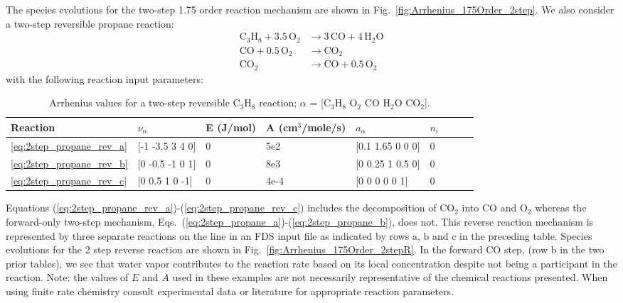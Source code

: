 \documentclass[11pt]{book}
\begin{document}
The species evolutions for the two-step 1.75 order reaction mechanism are shown in Fig.~\ref{fig:Arrhenius_175Order_2step}. We also consider a two-step reversible propane reaction:
\begin{subequations}
\begin{align}
\label{eq:2step_propane_rev_a}
\mathrm{C_3H_8+3.5 \, O_2} &\rightarrow \mathrm{3 \, CO+4 \, H_2O} \\
\label{eq:2step_propane_rev_b}
\mathrm{CO + 0.5 \, O_2} &\rightarrow \mathrm{CO_2} \\
\label{eq:2step_propane_rev_c}
\mathrm{CO_2} &\rightarrow \mathrm{CO + 0.5 \, O_2}
\end{align}
\end{subequations}
with the following reaction input parameters:
\begin{table}[ht]
\begin{center}
\caption[Arrhenius values for a two-step reversible C$_3$H$_8$ reaction]{Arrhenius values for a two-step reversible C$_3$H$_8$ reaction; $\alpha$ = [$\mathrm{C_3H_8}$ $\mathrm{O_2}$ $\mathrm{CO}$ $\mathrm{H_2O}$ $\mathrm{CO_2}$].}
\label{two_step_rev_c3h8}
\begin{tabular}{|l|l|l|l|l|l|l|l|l|}
\hline Reaction & $\nu_{\alpha}$ & E (J/mol) & A (cm$^3$/mole/s) & $a_{\alpha}$ & $n_i$  \\ \hline \hline
\ref{eq:2step_propane_rev_a} & [-1 -3.5 3 4 0] & 0 & 5e2  & [0.1 1.65 0 0 0] & 0 \\ \hline
\ref{eq:2step_propane_rev_b} & [0 -0.5 -1 0 1] & 0 & 8e3  & [0 0.25 1 0.5 0] & 0 \\ \hline
\ref{eq:2step_propane_rev_c} & [0 0.5 1 0 -1]  & 0 & 4e-4 & [0 0 0 0 0 1]    & 0 \\ \hline
\end{tabular}
\end{center}
\end{table}
Equations (\ref{eq:2step_propane_rev_a})-(\ref{eq:2step_propane_rev_c}) includes the decomposition of $\mathrm{CO_2}$ into $\mathrm{CO}$ and $\mathrm{O_2}$ whereas the forward-only two-step mechanism, Eqs.~(\ref{eq:2step_propane_a})-(\ref{eq:2step_propane_b}), does not. This reverse reaction mechanism is represented by three separate reactions on the  line in an FDS input file as indicated by rows $\mathrm{a}$, $\mathrm{b}$ and $\mathrm{c}$ in the preceding table. Species evolutions for the 2 step reverse reaction are shown in Fig.~\ref{fig:Arrhenius_175Order_2stepR}. In the forward CO step, (row $\mathrm{b}$ in the two prior tables), we see that water vapor contributes to the reaction rate based on its local concentration despite not being a participant in the reaction.
\vskip8pt
Note: the values of $E$ and $A$ used in these examples are not necessarily representative of the chemical reactions presented. When using finite rate chemistry consult experimental data or literature for appropriate reaction parameters.
\end{document}
